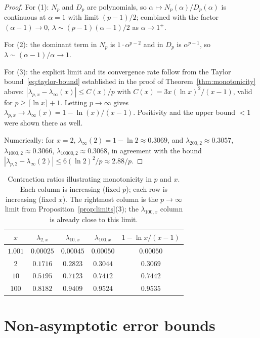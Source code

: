 \documentclass[11pt,a4paper]{article}
\theoremstyle{definition}
\begin{document}
\begin{proof}
For (1): $N_p$ and $D_p$ are polynomials, so $\alpha \mapsto N_p(\alpha)/D_p(\alpha)$ is continuous at $\alpha = 1$ with limit $(p-1)/2$; combined with the factor $(\alpha - 1) \to 0$, $\lambda \sim (p-1)(\alpha-1)/2$ as $\alpha \to 1^+$.

For (2): the dominant term in $N_p$ is $1 \cdot \alpha^{p-2}$ and in $D_p$ is $\alpha^{p-1}$, so $\lambda \sim (\alpha-1)/\alpha \to 1$.

For (3): the explicit limit and its convergence rate follow from the Taylor bound~\eqref{eq:taylor-bound} established in the proof of Theorem~\ref{thm:monotonicity} above:
$|\lambda_{p,x} - \lambda_\infty(x)| \leq C(x)/p$ with $C(x) = 3x(\ln x)^2/(x-1)$, valid for $p \geq \lceil \ln x \rceil + 1$. Letting $p \to \infty$ gives $\lambda_{p,x} \to \lambda_\infty(x) = 1 - \ln(x)/(x-1)$. Positivity and the upper bound $< 1$ were shown there as well.

Numerically: for $x = 2$, $\lambda_\infty(2) = 1 - \ln 2 \approx 0.3069$, and $\lambda_{200,2} \approx 0.3057$, $\lambda_{1000,2} \approx 0.3066$, $\lambda_{10000,2} \approx 0.3068$, in agreement with the bound $|\lambda_{p,2} - \lambda_\infty(2)| \leq 6(\ln 2)^2/p \approx 2.88/p$.
\end{proof}

\begin{table}[h]
\centering
\begin{tabular}{ccccc}
\toprule
$x$ & $\lambda_{2,x}$ & $\lambda_{10,x}$ & $\lambda_{100,x}$ & $1 - \ln x / (x-1)$ \\
\midrule
$1.001$ & $0.00025$ & $0.00045$ & $0.00050$ & $0.00050$ \\
$2$ & $0.1716$ & $0.2823$ & $0.3044$ & $0.3069$ \\
$10$ & $0.5195$ & $0.7123$ & $0.7412$ & $0.7442$ \\
$100$ & $0.8182$ & $0.9409$ & $0.9524$ & $0.9535$ \\
\bottomrule
\end{tabular}
\caption{Contraction ratios illustrating monotonicity in $p$ and $x$. Each column is increasing (fixed $p$); each row is increasing (fixed $x$). The rightmost column is the $p \to \infty$ limit from Proposition~\ref{prop:limits}(3); the $\lambda_{100,x}$ column is already close to this limit.}
\end{table}

\section{Non-asymptotic error bounds}
\label{sec:nonasymptotic}
\end{document}
